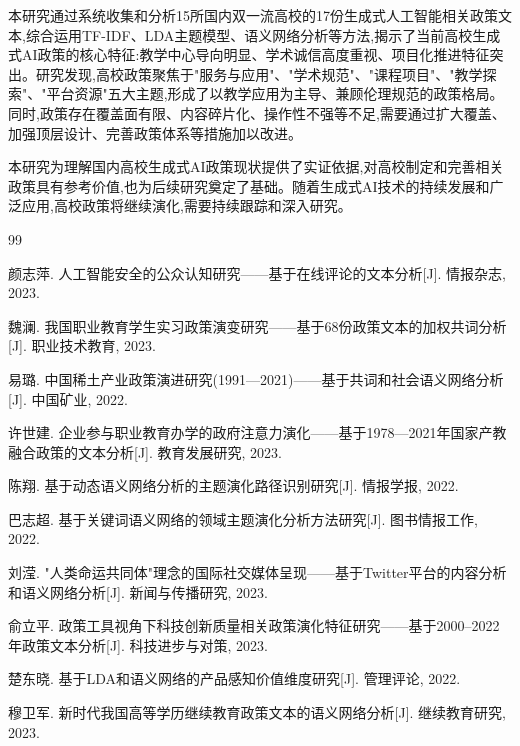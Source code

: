 \documentclass[cn,11pt,chinese]{article}
\begin{document}
本研究通过系统收集和分析15所国内双一流高校的17份生成式人工智能相关政策文本,综合运用TF-IDF、LDA主题模型、语义网络分析等方法,揭示了当前高校生成式AI政策的核心特征:教学中心导向明显、学术诚信高度重视、项目化推进特征突出。研究发现,高校政策聚焦于"服务与应用"、"学术规范"、"课程项目"、"教学探索"、"平台资源"五大主题,形成了以教学应用为主导、兼顾伦理规范的政策格局。同时,政策存在覆盖面有限、内容碎片化、操作性不强等不足,需要通过扩大覆盖、加强顶层设计、完善政策体系等措施加以改进。

本研究为理解国内高校生成式AI政策现状提供了实证依据,对高校制定和完善相关政策具有参考价值,也为后续研究奠定了基础。随着生成式AI技术的持续发展和广泛应用,高校政策将继续演化,需要持续跟踪和深入研究。

\begin{thebibliography}{99}

 颜志萍. 人工智能安全的公众认知研究——基于在线评论的文本分析[J]. 情报杂志, 2023.

 魏澜. 我国职业教育学生实习政策演变研究——基于68份政策文本的加权共词分析[J]. 职业技术教育, 2023.

 易璐. 中国稀土产业政策演进研究(1991—2021)——基于共词和社会语义网络分析[J]. 中国矿业, 2022.

 许世建. 企业参与职业教育办学的政府注意力演化——基于1978—2021年国家产教融合政策的文本分析[J]. 教育发展研究, 2023.

 陈翔. 基于动态语义网络分析的主题演化路径识别研究[J]. 情报学报, 2022.

 巴志超. 基于关键词语义网络的领域主题演化分析方法研究[J]. 图书情报工作, 2022.

 刘滢. "人类命运共同体"理念的国际社交媒体呈现——基于Twitter平台的内容分析和语义网络分析[J]. 新闻与传播研究, 2023.

 俞立平. 政策工具视角下科技创新质量相关政策演化特征研究——基于2000–2022年政策文本分析[J]. 科技进步与对策, 2023.

 楚东晓. 基于LDA和语义网络的产品感知价值维度研究[J]. 管理评论, 2022.

 穆卫军. 新时代我国高等学历继续教育政策文本的语义网络分析[J]. 继续教育研究, 2023.

\end{thebibliography}
\end{document}
